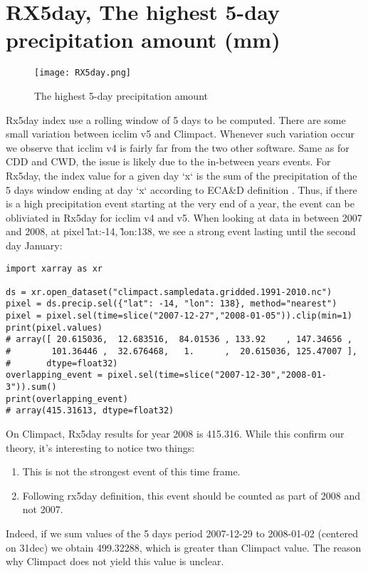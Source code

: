 \documentclass[a4paper,11pt]{article}
\begin{document}
    \section{RX5day, The highest 5-day precipitation amount (mm)}
        \begin{figure}[h]
            \centering
            \texttt{[image: RX5day.png]}
            \caption{The highest 5-day precipitation amount}
            \label{figure/rx5day}
        \end{figure}
        Rx5day index use a rolling window of 5 days to be computed.
        There are some small variation between icclim v5 and Climpact. Whenever such variation occur we observe that icclim v4 is fairly far from 
        the two other software.
        Same as for CDD and CWD, the issue is likely due to the in-between years events.
        For Rx5day, the index value for a given day `x` is the sum of the precipitation of the 5 days window ending at day `x` according to ECA\&D definition \cite{doc/ecad_new}.
        Thus, if there is a high precipitation event starting at the very end of a year, the event can be obliviated in Rx5day for icclim v4 and v5.
        When looking at data in between 2007 and 2008, at pixel \~lat:-14, \~lon:138, we see a strong event lasting until the second day January:
        \begin{minipage}{\linewidth}
        \begin{lstlisting}
import xarray as xr

ds = xr.open_dataset("climpact.sampledata.gridded.1991-2010.nc")
pixel = ds.precip.sel({"lat": -14, "lon": 138}, method="nearest")
pixel = pixel.sel(time=slice("2007-12-27","2008-01-05")).clip(min=1)
print(pixel.values)
# array([ 20.615036,  12.683516,  84.01536 , 133.92    , 147.34656 ,
#        101.36446 ,  32.676468,   1.      ,  20.615036, 125.47007 ],
#       dtype=float32)
overlapping_event = pixel.sel(time=slice("2007-12-30","2008-01-3")).sum()
print(overlapping_event)
# array(415.31613, dtype=float32)
        \end{lstlisting}
        \end{minipage}

        On Climpact, Rx5day results for year 2008 is 415.316. While this confirm our theory, it's interesting to notice two things:
        \begin{enumerate}
            \item This is not the strongest event of this time frame.
            \item Following rx5day definition, this event should be counted as part of 2008 and not 2007.
        \end{enumerate}
        Indeed, if we sum values of the 5 days period 2007-12-29 to 2008-01-02 (centered on 31dec) we obtain 499.32288, 
        which is greater than Climpact value.
        The reason why Climpact does not yield this value is unclear.
\end{document}
